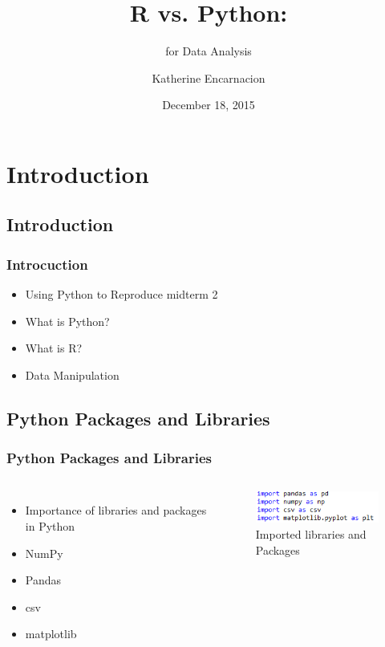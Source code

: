 \documentclass{beamer}
\title{R vs. Python:}
\author{Katherine Encarnacion}
\date{December 18, 2015}
\subtitle{for Data Analysis}
\institute{MATG 611}
\begin{document}
\begin{frame}
\titlepage
\end{frame}

\section{Introduction}


\subsection{Introduction}

\begin{frame}
\frametitle{Introcuction}
\begin{itemize}
\setlength\itemsep{3em}
\item Using Python to Reproduce midterm 2
\item What is Python?
\item What is R?
\item Data Manipulation
\end{itemize}
\end{frame}

\subsection{Python Packages and Libraries}


\begin{frame}
\frametitle{Python Packages and Libraries}
\begin{columns}
\begin{itemize}
\setlength\itemsep{1em}
\item Importance of libraries and packages in Python
\item NumPy
\item Pandas
\item csv
\item matplotlib
\end{itemize}
\begin{figure}
\includegraphics[width=2in]{import.png}
\caption{\label{Imported libraries and Packages}Imported libraries and Packages} 
\end{figure} 
\end{columns}
\end{frame}
\end{document}
